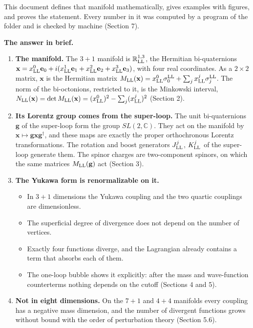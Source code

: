 \documentclass[
  10pt,
]{article}
\providecommand{\tightlist}{%
  \setlength{\itemsep}{0pt}\setlength{\parskip}{0pt}}
\begin{document}
This document defines that manifold mathematically, gives examples with
figures, and proves the statement. Every number in it was computed by a
program of the folder and is checked by machine (Section 7).

\textbf{The answer in brief.}

\begin{enumerate}
\def\labelenumi{\arabic{enumi}.}
\tightlist
\item
  \textbf{The manifold.} The \(3+1\) manifold is
  \(\mathbb R^{1,3}_{\rm LL}\), the Hermitian bi-quaternions
  \(\mathbf x=x^0_{\rm LL}\mathbf e_0+i(x^1_{\rm LL}\mathbf e_1+x^2_{\rm LL}\mathbf e_2+x^3_{\rm LL}\mathbf e_3)\),
  with four real coordinates. As a \(2\times2\) matrix, \(\mathbf x\) is
  the Hermitian matrix
  \(M_{\rm LL}(\mathbf x)=x^0_{\rm LL}\sigma^{\rm LL}_0+\sum_jx^j_{\rm LL}\sigma^{\rm LL}_j\).
  The norm of the bi-octonions, restricted to it, is the Minkowski
  interval,
  \(N_{\rm LL}(\mathbf x)=\det M_{\rm LL}(\mathbf x)=(x^0_{\rm LL})^2-\sum_j(x^j_{\rm LL})^2\)
  (Section 2).
\item
  \textbf{Its Lorentz group comes from the super-loop.} The unit
  bi-quaternions \(\mathbf g\) of the super-loop form the group
  \(SL(2,\mathbb C)\). They act on the manifold by
  \(\mathbf x\mapsto\mathbf g\mathbf x\mathbf g^\dagger\), and these
  maps are exactly the proper orthochronous Lorentz transformations. The
  rotation and boost generators \(J^j_{\rm LL}\), \(K^j_{\rm LL}\) of
  the super-loop generate them. The spinor charges are two-component
  spinors, on which the same matrices \(M_{\rm LL}(\mathbf g)\) act
  (Section 3).
\item
  \textbf{The Yukawa form is renormalizable on it.}

  \begin{itemize}
  \tightlist
  \item
    In \(3+1\) dimensions the Yukawa coupling and the two quartic
    couplings are dimensionless.
  \item
    The superficial degree of divergence does not depend on the number
    of vertices.
  \item
    Exactly four functions diverge, and the Lagrangian already contains
    a term that absorbs each of them.
  \item
    The one-loop bubble shows it explicitly: after the mass and
    wave-function counterterms nothing depends on the cutoff (Sections 4
    and 5).
  \end{itemize}
\item
  \textbf{Not in eight dimensions.} On the \(7+1\) and \(4+4\) manifolds
  every coupling has a negative mass dimension, and the number of
  divergent functions grows without bound with the order of perturbation
  theory (Section 5.6).
\end{enumerate}
\end{document}

